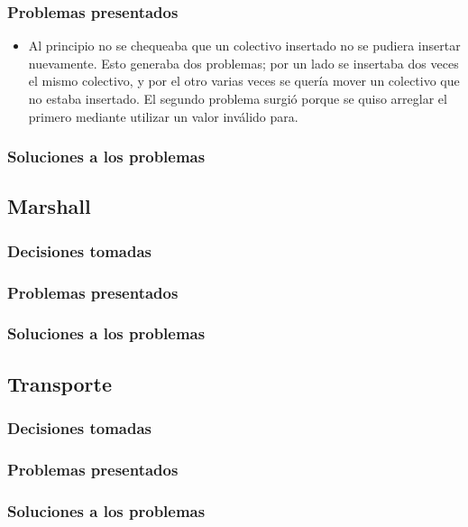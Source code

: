 \documentclass[a4paper,10pt]{elsart}
\begin{document}
\subsubsection{Problemas presentados}
\begin{itemize}
	\item Al principio no se chequeaba que un colectivo insertado no se pudiera insertar nuevamente. Esto generaba dos problemas; por un lado se insertaba dos veces el mismo colectivo, y por el otro varias veces se quería mover un colectivo que no estaba insertado. El segundo problema surgió porque se quiso arreglar el primero mediante utilizar un valor inválido para.
\end{itemize}


\subsubsection{Soluciones a los problemas}
\subsection{Marshall}
\subsubsection{Decisiones tomadas}
\subsubsection{Problemas presentados}
\subsubsection{Soluciones a los problemas}
\subsection{Transporte}
\subsubsection{Decisiones tomadas}
\subsubsection{Problemas presentados}
\subsubsection{Soluciones a los problemas}
\end{document}
